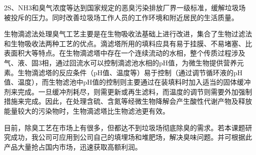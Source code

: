\par
{}2S、NH3和臭气浓度等达到国家规定的恶臭污染排放厂界一级标准，缓解垃圾场被投斥的压力。同时改善垃圾场工作人员的工作环境和附近居民的生活质量。\par
生物滴滤法处理臭气工艺主要是在生物吸收法基础上进行改进，集合了生物过滤法和生物吸收法两种工艺的优点。滴滤塔所用的填料应具有易于挂膜、不易堵塞、比表面积大等特点。在生物滴滤塔中存在一个连续流动的水相，整个传质过程涉及气、液、固3相，通过回流水可以控制滴滤池水相的pH值，为微生物提供营养元素。生物滴滤塔的反应条件（pH值、温度等）易于控制（通过调节循环液的pH值、温度），而生物滤池中pH值的控制则主要通过在装填料时加入适当的固体缓冲剂来完成。一旦缓冲剂耗尽，则需更新或再生滤料，而温度的调节则需要外加强制措施来完成。因此，在处理含硫、含氮等经微生物降解会产生酸性代谢产物及释放能量较大的污染物时，生物滴滤塔比生物滤池更有效。\par
目前，除臭工艺在市场上有很多，但都达不到垃圾场彻底除臭的需求。若本课题研究成功，我公司可应用到公司自己的填埋场和堆肥场，解决臭味问题。并可根据此产品大量抢占国内市场，迅速获取高额利润。\par
